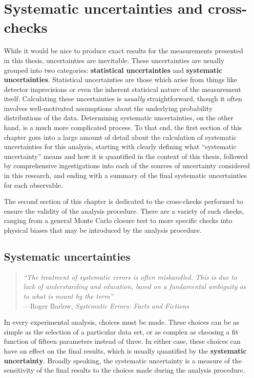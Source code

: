 \chapter{Systematic uncertainties and cross-checks}
\label{chapter_systematics}
While it would be nice to produce exact results for the measurements presented in this thesis, uncertainties are inevitable. These uncertainties are usually grouped into two categories: \textbf{statistical uncertainties} and \textbf{systematic uncertainties}. Statistical uncertainties are those which arise from things like detector imprecisions or even the inherent statisical nature of the measurement itself. Calculating these uncertainties is \textit{usually} straightforward, though it often involves well-motivated assumptions about the underlying probability distributions of the data. Determining systematic uncertainties, on the other hand, is a much more complicated process. To that end, the first section of this chapter goes into a large amount of detail about the calculation of systematic uncertainties for this analysis, starting with clearly defining what ``systematic uncertainty'' means and how it is quantified in the context of this thesis, followed by comprehensive ingestigations into each of the sources of uncertainty considered in this research, and ending with a summary of the final systematic uncertainties for each observable.

The second section of this chapter is dedicated to the cross-checks performed to ensure the validity of the analysis procedure. There are a variety of such checks, ranging from a general Monte Carlo closure test to more specific checks into physical biases that may be introduced by the analysis procedure.



\section{Systematic uncertainties}
\label{sec:systematics}
\begin{quote}
    \textit{``The treatment of systematic errors is often mishandled. This is due to lack of understanding and education, based on a fundamental ambiguity as to what is meant by the term''}\\
    \hspace*{1cm}---Roger Barlow, \textit{Systematic Errors: Facts and Fictions}~\cite{BarlowCheck}
\end{quote}

In every experimental analysis, choices must be made. These choices can be as simple as the selection of a particular data set, or as complex as choosing a fit function of fifteen parameters instead of three. In either case, these choices can have an effect on the final results, which is usually quantified by the \textbf{systematic uncertainty}. Broadly speaking, the systematic uncertainty is a measure of the sensitivity of the final results to the choices made during the analysis procedure. 

